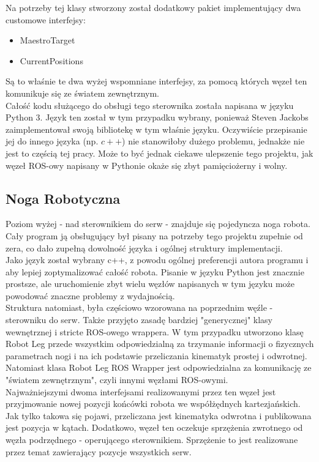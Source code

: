 \documentclass[a4paper,13pt]{article}
\begin{document}
Na potrzeby tej klasy stworzony został dodatkowy pakiet implementujący dwa customowe interfejsy:
\begin{itemize}
\item MaestroTarget
\item CurrentPositions
\end{itemize}

Są to właśnie te dwa wyżej wspomniane interfejsy, za pomocą których węzeł ten komunikuje się ze światem zewnętrznym.\\

Całość kodu służącego do obsługi tego sterownika została napisana w języku Python 3. Język ten został w tym przypadku wybrany, ponieważ Steven Jackobs zaimplementował swoją bibliotekę w tym właśnie języku. Oczywiście przepisanie jej do innego języka (np. $c++$) nie stanowiłoby dużego problemu, jednakże nie jest to częścią tej pracy. Może to być jednak ciekawe ulepszenie tego projektu, jak węzeł ROS-owy napisany w Pythonie okaże się zbyt pamięciożerny i wolny.
\subsection{Noga Robotyczna}
Poziom wyżej - nad sterownikiem do serw - znajduje się pojedyncza noga robota. Cały program ją obsługujący był pisany na potrzeby tego projektu zupełnie od zera, co dało zupełną dowolność języka i ogólnej struktury implementacji. \\

Jako język został wybrany c++, z powodu ogólnej preferencji autora programu i aby lepiej zoptymalizować całość robota. Pisanie w języku Python jest znacznie prostsze, ale uruchomienie zbyt wielu węzłów napisanych w tym języku może powodować znaczne problemy z wydajnością.\\

Struktura natomiast, była częściowo wzorowana na poprzednim węźle - sterowniku do serw. Także przyjęto zasadę bardziej "generycznej" klasy wewnętrznej i stricte ROS-owego wrappera. W tym przypadku utworzono klasę Robot Leg przede wszystkim odpowiedzialną za trzymanie informacji o fizycznych parametrach nogi i na ich podstawie przeliczania kinematyk prostej i odwrotnej. Natomiast klasa Robot Leg ROS Wrapper jest odpowiedzialna za komunikację ze "światem zewnętrznym", czyli innymi węzłami ROS-owymi.\\

Najważniejszymi dwoma interfejsami realizowanymi przez ten węzeł jest przyjmowanie nowej pozycji końcówki robota we współżędnych kartezjańskich. Jak tylko takowa się pojawi, przeliczana jest kinematyka odwrotna i publikowana jest pozycja w kątach. Dodatkowo, węzeł ten oczekuje sprzężenia zwrotnego od węzła podrzędnego - operującego sterownikiem. Sprzężenie to jest realizowane przez temat zawierający pozycje wszystkich serw. \\
\end{document}
